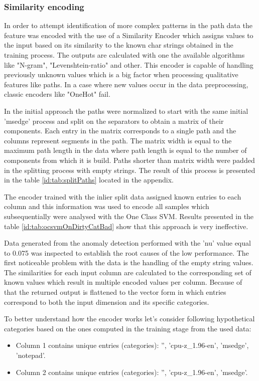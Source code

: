 \documentclass[a4paper,twoside,12pt]{book}
\begin{document}
\subsubsection{Similarity encoding}

In order to attempt identification of more complex patterns in the path data the feature was encoded with
the use of a Similarity Encoder which assigns values to the input based on its similarity 
to the known char strings obtained in the training process. The outputs are calculated with 
one the available algorithms like "N-gram", "Levenshtein-ratio" and other. This encoder is
capable of handling previously unknown values which is a big factor when processing 
qualitative features like paths. In a case where new values occur in the data preprocessing,
classic encoders like "OneHot" fail. 

In the initial approach the paths were normalized to start with the same initial 'msedge' 
process and split on the separators to obtain a matrix of their components. Each entry in the
matrix corresponds to a single path and the columns represent segments in the path. The matrix
width is equal to the maximum path length in the data where path length is equal to the number
of components from which it is build. Paths shorter than matrix width were padded in the splitting
process with empty strings. The result of this process is presented in the table \ref{id:tab:splitPaths} 
located in the appendix. 

The encoder trained with the inlier split data assigned known entries to each column and this 
information was used to encode all samples which subsequentially were analysed with the One Class
SVM. Results presented in the table \ref{id:tab:ocsvmOnDirtyCatBad} show that this approach is 
very ineffective. 

Data generated from the anomaly detection performed with the 'nu' value equal to 0.075 was inspected 
to establish the root causes of the low performance. The first noticeable problem with the data
is the handling of the empty string values. The similarities for each input column are 
calculated to the corresponding set of known values which result in multiple encoded values per
column. Because of that the returned output is flattened to the vector form in which entries
correspond to both the input dimension and its specific categories. 

To better understand how the encoder works let's consider following hypothetical categories based on the ones computed 
in the training stage from the used data:
\begin{itemize}
	\item Column 1 contains unique entries (categories): '', 'cpu-z\_1.96-en', 'msedge', 'notepad'.
	\item Column 2 contains unique entries (categories): '', 'cpu-z\_1.96-en', 'msedge'.
\end{itemize}
\end{document}
